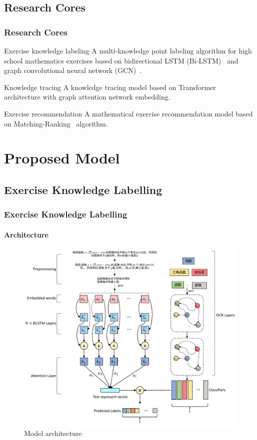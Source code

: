 \documentclass{beamer}
\begin{document}
\subsection{Research Cores}
\begin{frame}
  \frametitle{Research Cores}
  \begin{block}{Exercise knowledge labeling}
    A multi-knowledge point labeling algorithm for high school mathematics exercises based on bidirectional LSTM (Bi-LSTM)~\cite{chen2017improving} and graph convolutional neural network (GCN)~\cite{kipf2016semi}.
  \end{block}
  \begin{block}{Knowledge tracing}
    A knowledge tracing model based on Transformer~\cite{vaswani2017attention} architecture with graph attention network embedding.
  \end{block}
  \begin{block}{Exercise recommendation}
    A mathematical exercise recommendation model based on Matching-Ranking~\cite{segev2009context} algorithm.
  \end{block}
\end{frame}
\section{Proposed Model}
\subsection{Exercise Knowledge Labelling}
\begin{frame}
  \frametitle{Exercise Knowledge Labelling}
  \framesubtitle{Architecture}
  \begin{figure}
    \includegraphics[height=0.80\textheight]{figures/ch2-ov.pdf}
    \caption{Model architecture}\label{fig:ch2-archi}
  \end{figure}
\end{frame}
\end{document}
